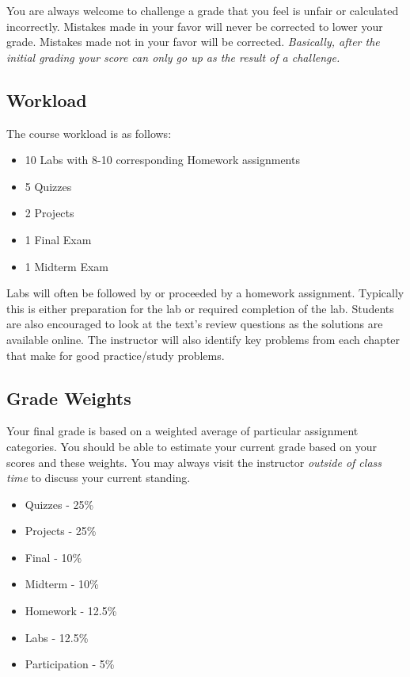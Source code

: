 \documentclass[10pt]{article}
\begin{document}
You are always welcome to challenge a grade that you feel is unfair or calculated incorrectly.  Mistakes made in your favor will never be corrected to lower your grade.  Mistakes made not in your favor will be corrected.  \textit{Basically, after the initial grading your score can only go up as the result of a challenge.}

\subsection{Workload}

The course workload is as follows:
\begin{itemize}
\item 10 Labs with 8-10 corresponding Homework assignments
\item 5 Quizzes
\item 2 Projects
\item 1 Final Exam
\item 1 Midterm Exam
\end{itemize}

Labs will often be followed by or proceeded by a homework assignment.  Typically this is either preparation for the lab or required completion of the lab. Students are also encouraged to look at the text's review questions as the solutions are available online.  The instructor will also identify key problems from each chapter that make for good practice/study problems. 


\subsection{Grade Weights}

Your final grade is based on a weighted average of particular assignment categories.  You should be able to estimate your current grade based on your scores and these weights.  You may always visit the instructor \textit{outside of class time} to discuss your current standing.  
\begin{itemize}
\item Quizzes - 25\%
\item Projects - 25\%
\item Final - 10\%
\item Midterm - 10\%
\item Homework - 12.5\%
\item Labs - 12.5\%
\item Participation - 5\%
\end{itemize}
\end{document}
